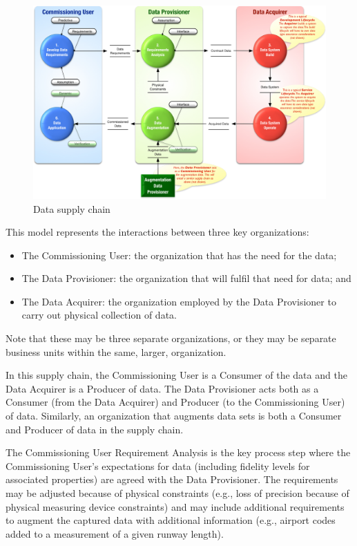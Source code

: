 \begin{figure}[htbp]
  \centering
  \includegraphics[width=\textwidth]{images/dataacquisitionlifecycleflat}
  \caption{Data supply chain}
  \label{fig:dataacquisitionlifecycle}
\end{figure}

This model represents the interactions between three key organizations:
\begin{itemize}
  \item The Commissioning User: the organization that has the need for the data;
  \item The Data Provisioner: the organization that will fulfil that need for data; and
  \item The Data Acquirer: the organization employed by the Data Provisioner to carry out physical collection of data.
\end{itemize}

Note that these may be three separate organizations, or they may be separate business units within the same, larger, organization.

In this supply chain, the Commissioning User is a Consumer of the data and the Data Acquirer is a Producer of data. The Data Provisioner acts both as a Consumer (from the Data Acquirer) and Producer (to the Commissioning User) of data. Similarly, an organization that augments data sets is both a Consumer and Producer of data in the supply chain.

The Commissioning User Requirement Analysis is the key process step where the Commissioning User's expectations for data (including fidelity levels for associated properties) are agreed with the Data Provisioner. The requirements may be adjusted because of physical constraints (e.g., loss of precision because of physical measuring device constraints) and may include additional requirements to augment the captured data with additional information (e.g., airport codes added to a measurement of a given runway length).

